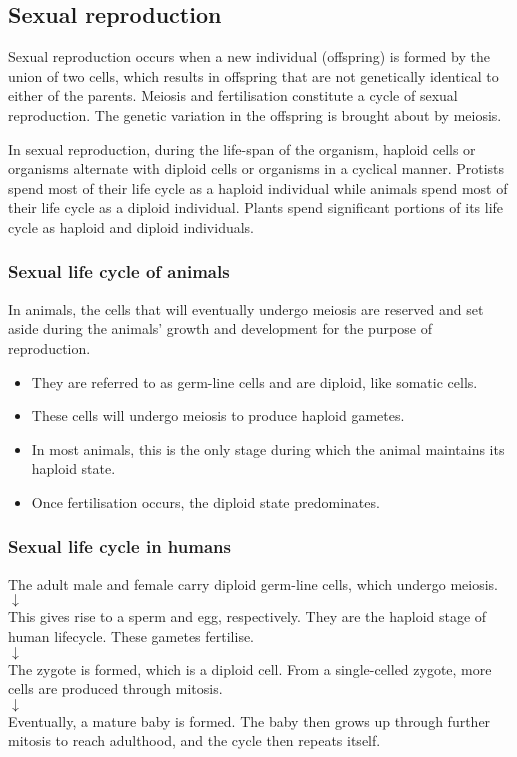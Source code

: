 \documentclass[11pt]{article}
\begin{document}
\subsection{Sexual reproduction}
\label{sec:org5aa7135}
Sexual reproduction occurs when a new individual (offspring) is formed by the union of two cells, which results in offspring that are not genetically identical to either of the parents. Meiosis and fertilisation constitute a cycle of sexual reproduction. The genetic variation in the offspring is brought about by meiosis.


In sexual reproduction, during the life-span of the organism, haploid cells or organisms alternate with diploid cells or organisms in a cyclical manner. Protists spend most of their life cycle as a haploid individual while animals spend most of their life cycle as a diploid individual. Plants spend significant portions of its life cycle as haploid and diploid individuals.
\subsubsection{Sexual life cycle of animals}
\label{sec:orgdc13af3}
In animals, the cells that will eventually undergo meiosis are reserved and set aside during the animals' growth and development for the purpose of reproduction.
\begin{itemize}
\item They are referred to as germ-line cells and are diploid, like somatic cells.
\item These cells will undergo meiosis to produce haploid gametes.
\item In most animals, this is the only stage during which the animal maintains its haploid state.
\item Once fertilisation occurs, the diploid state predominates.
\end{itemize}
\subsubsection{Sexual life cycle in humans}
\label{sec:org7410c43}

\begin{center}
The adult male and female carry diploid germ-line cells, which undergo meiosis. \\
$\downarrow$ \\
This gives rise to a sperm and egg, respectively. They are the haploid stage of human lifecycle. These gametes fertilise. \\
$\downarrow$ \\
The zygote is formed, which is a diploid cell. From a single-celled zygote, more cells are produced through mitosis. \\
$\downarrow$ \\
Eventually, a mature baby is formed. The baby then grows up through further mitosis to reach adulthood, and the cycle then repeats itself.
\end{center}
\end{document}
